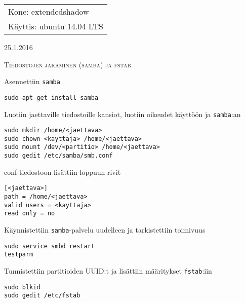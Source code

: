 \documentclass[main.tex]{subfiles}
\begin{document}
\thispagestyle{empty}
\begin{tabular}[t]{l}
Kone: extendedshadow\\
Käyttis: ubuntu 14.04 LTS
\end{tabular}
\hfill 25.1.2016

{\scshape\Large{Tiedostojen jakaminen (samba) ja fstab}}

Asennettiin \texttt{samba}

\begin{lstlisting}
sudo apt-get install samba
\end{lstlisting}

Luotiin jaettaville tiedostoille kansiot, luotiin oikeudet käyttöön ja \texttt{samba}:an

\begin{lstlisting}
sudo mkdir /home/<jaettava>
sudo chown <kayttaja> /home/<jaettava>
sudo mount /dev/<partitio> /home/<jaettava>
sudo gedit /etc/samba/smb.conf
\end{lstlisting}

conf-tiedostoon lisättiin loppuun rivit

\begin{lstlisting}
[<jaettava>]
path = /home/<jaettava>
valid users = <kayttaja>
read only = no
\end{lstlisting}

Käynnistettiin \texttt{samba}-palvelu uudelleen ja tarkistettiin toimivuus

\begin{lstlisting}
sudo service smbd restart
testparm
\end{lstlisting}

Tunnistettiin partitioiden UUID:t ja lisättiin määritykset \texttt{fstab}:iin

\begin{lstlisting}
sudo blkid
sudo gedit /etc/fstab
\end{lstlisting}
\end{document}
